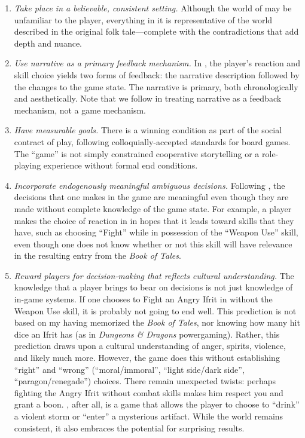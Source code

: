 \documentclass[a4paper]{article}
\begin{document}
\begin{enumerate}
\item \textit{Take place in a believable, consistent setting.} 
 Although the world of \totan{} may be unfamiliar to the player,
 everything in it is representative of the world described in the original
 folk tale---complete with the contradictions that add depth and nuance.

\item \textit{Use narrative as a primary feedback mechanism.} 
 In \totan{}, the player's reaction and skill choice yields two forms
 of feedback: the narrative description followed by the changes to the
 game state. The narrative is primary, both chronologically and aesthetically.
 Note that we follow \citet{Koster2012} in treating narrative as a 
 feedback mechanism, not a game mechanism.


\item \textit{Have measurable goals.} There is a winning condition as part
 of the social contract of play, following colloquially-accepted 
 standards for board games. The ``game'' is not simply constrained
 cooperative storytelling or a role-playing experience without formal end
 conditions.

\item \textit{Incorporate endogenously meaningful ambiguous decisions.}
 Following \citet{Burgun2012}, the decisions that one makes in the game
 are meaningful even though they are made without complete knowledge
 of the game state. For example, a player makes 
 the choice of reaction in \totan{} in hopes that it leads toward skills
 that they have, such as choosing ``Fight'' while in possession of the
 ``Weapon Use'' skill, even though one does not know whether or not
 this skill will have relevance in the resulting entry from the
 \textit{Book of Tales}.

\item \textit{Reward players for decision-making that reflects
    cultural understanding.}  The knowledge that a player brings to
  bear on decisions is not just knowledge of in-game systems.  If one
  chooses to Fight an Angry Ifrit in \totan{} without the Weapon Use
  skill, it is probably not going to end well. This prediction is not
  based on my having memorized the \textit{Book of Tales}, nor knowing how many
  hit dice an Ifrit has (as in \textit{Dungeons \& Dragons} powergaming).
  Rather, this prediction draws upon a cultural understanding of anger,
  spirits, violence, and likely much more.
  However, the game does this without establishing
  ``right'' and ``wrong'' (``moral/immoral'',
  ``light side/dark side'', ``paragon/renegade'') choices.  There
  remain unexpected twists: perhaps fighting the Angry Ifrit without
  combat skills makes him respect you and grant a boon.  \totan{},
  after all, is a game that allows the player to choose to ``drink'' a
  violent storm or ``enter'' a mysterious artifact.  While the world
  remains consistent, it also embraces the potential for surprising
  results.

\end{enumerate}
\end{document}

